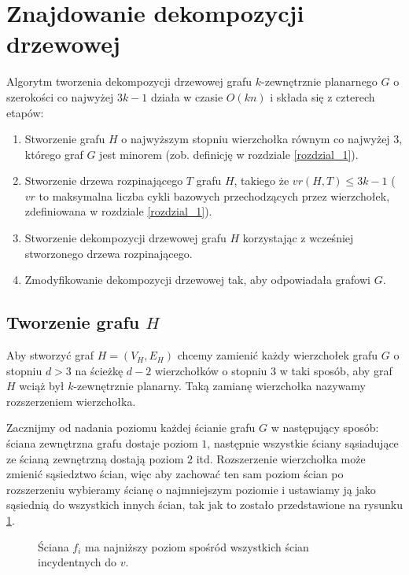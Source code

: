 \documentclass[twoside,a4paper,12pt]{report} %
\theoremstyle{break}
\begin{document}
\section{Znajdowanie dekompozycji drzewowej} \label{sekcja_5.1}
Algorytm tworzenia dekompozycji drzewowej grafu $k$-zewnętrznie planarnego $G$ o szerokości co najwyżej $3k-1$ działa w czasie $O(kn)$ i składa się z czterech etapów:
\begin{enumerate}
    \item Stworzenie grafu $H$ o najwyższym stopniu wierzchołka równym co najwyżej $3$, którego graf $G$ jest minorem (zob. definicję w rozdziale \ref{rozdzial_1}).
    \item Stworzenie drzewa rozpinającego $T$ grafu $H$, takiego że $vr(H,T) \leq 3k-1$ ($vr$ to maksymalna liczba cykli bazowych przechodzących przez wierzchołek, zdefiniowana w rozdziale \ref{rozdzial_1}).
    \item Stworzenie dekompozycji drzewowej grafu $H$ korzystając z wcześniej stworzonego drzewa rozpinającego.
    \item Zmodyfikowanie dekompozycji drzewowej tak, aby odpowiadała grafowi $G$.
\end{enumerate}

\subsection[Tworzenie grafu H]{Tworzenie grafu $H$}
Aby stworzyć graf $H=(V_H,E_H)$ chcemy zamienić każdy wierzchołek grafu $G$ o stopniu $d > 3$ na ścieżkę $d-2$ wierzchołków o stopniu $3$ w taki sposób, aby graf $H$ wciąż był $k$-zewnętrznie planarny. Taką zamianę wierzchołka nazywamy rozszerzeniem wierzchołka.

Zacznijmy od nadania poziomu każdej ścianie grafu $G$ w następujący sposób: ściana zewnętrzna grafu dostaje poziom $1$, następnie wszystkie ściany sąsiadujące ze ścianą zewnętrzną dostają poziom $2$ itd. Rozszerzenie wierzchołka może zmienić sąsiedztwo ścian, więc aby zachować ten sam poziom ścian po rozszerzeniu wybieramy ścianę o najmniejszym poziomie i ustawiamy ją jako sąsiednią do wszystkich innych ścian, tak jak to zostało przedstawione na rysunku \ref{expanding}.

\begin{figure}[ht]
    \centering
    
    \caption{Ściana $f_i$ ma najniższy poziom spośród wszystkich ścian incydentnych do $v$.}
    \label{expanding}
\end{figure}
\end{document}
